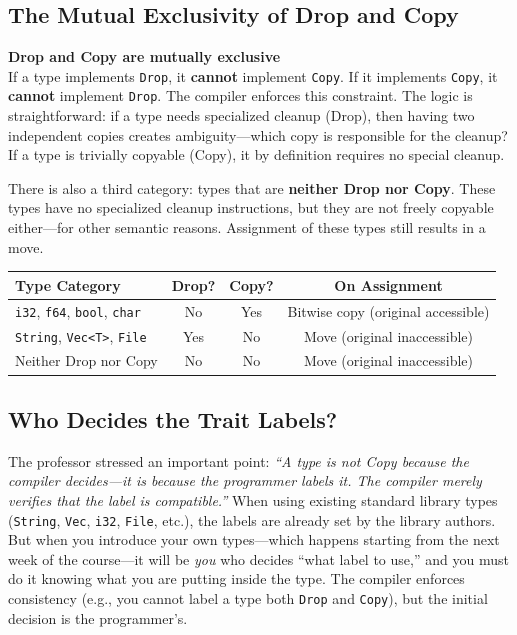 \subsection{The Mutual Exclusivity of Drop and Copy}

\begin{warningbox}
\textbf{Drop and Copy are mutually exclusive} \\
If a type implements \texttt{Drop}, it \textbf{cannot} implement \texttt{Copy}. If it implements \texttt{Copy}, it \textbf{cannot} implement \texttt{Drop}. The compiler enforces this constraint. The logic is straightforward: if a type needs specialized cleanup (Drop), then having two independent copies creates ambiguity---which copy is responsible for the cleanup? If a type is trivially copyable (Copy), it by definition requires no special cleanup.
\end{warningbox}

There is also a third category: types that are \textbf{neither Drop nor Copy}. These types have no specialized cleanup instructions, but they are not freely copyable either---for other semantic reasons. Assignment of these types still results in a move.

\begin{center}
\begin{tabular}{|l|c|c|c|}
\hline
\textbf{Type Category} & \textbf{Drop?} & \textbf{Copy?} & \textbf{On Assignment} \\
\hline
\texttt{i32}, \texttt{f64}, \texttt{bool}, \texttt{char} & No & Yes & Bitwise copy (original accessible) \\
\texttt{String}, \texttt{Vec<T>}, \texttt{File} & Yes & No & Move (original inaccessible) \\
Neither Drop nor Copy & No & No & Move (original inaccessible) \\
\hline
\end{tabular}
\end{center}

\subsection{Who Decides the Trait Labels?}

The professor stressed an important point: \emph{``A type is not Copy because the compiler decides---it is because the programmer labels it. The compiler merely verifies that the label is compatible.''} When using existing standard library types (\texttt{String}, \texttt{Vec}, \texttt{i32}, \texttt{File}, etc.), the labels are already set by the library authors. But when you introduce your own types---which happens starting from the next week of the course---it will be \emph{you} who decides ``what label to use,'' and you must do it knowing what you are putting inside the type. The compiler enforces consistency (e.g., you cannot label a type both \texttt{Drop} and \texttt{Copy}), but the initial decision is the programmer's.

